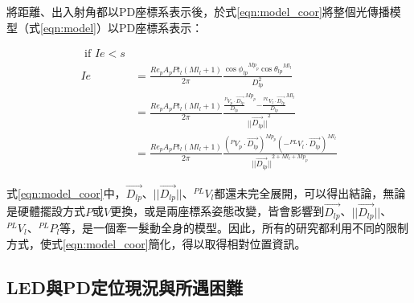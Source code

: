\begin{description}
        \qquad
        將距離、出入射角都以PD座標系表示後，於式\ref{eqn:model_coor}將整個光傳播模型（式\ref{eqn:model}）以PD座標系表示：

        \begin{equation}
            \label{eqn:model_coor}
            \begin{aligned}
                \text { if } Ie<s \\
                Ie &= \frac{Re_pA_pPt_l(Ml_{l}+1)}{2 \pi} \frac{ {\cos\phi_{lp}}^{Mp_{p}} {\cos \theta_{lp}}^{Ml_{l}}}{D^2_{lp}}\\
                    & = \frac{Re_pA_pPt_l(Ml_{l}+1)}{2 \pi} \frac{ {\frac{^{P}V_p \cdot \vec{D_{lp}}}{D_{lp}}}^{Mp_{p}} {-\frac{^{PL}V_l \cdot \vec{D_{lp}}}{D_{lp}}}^{Ml_{l}}}  {{||\vec{D_{lp}}||}^2}\\
                    & = \frac{Re_pA_pPt_l(Ml_{l}+1)}{2 \pi} \frac{ {{(^{P}V_p \cdot \vec{D_{lp}})}}^{Mp_{p}} {(-^{PL}V_l \cdot \vec{D_{lp}})}^{Ml_{l}}}  {{||\vec{D_{lp}}||}^{2+Ml_l+Mp_p}}
            \end{aligned}
        \end{equation}

        \qquad
        式\ref{eqn:model_coor}中，$\vec{D_{lp}}$、$||\vec{D_{lp}}||$、$^{PL}V_l$都還未完全展開，可以得出結論，無論是硬體擺設方式$P$或$V$更換，或是兩座標系姿態改變，皆會影響到$\vec{D_{lp}}$、$||\vec{D_{lp}}||$、$^{PL}V_l$、$^{PL}P_l$等，是一個牽一髮動全身的模型。因此，所有的研究都利用不同的限制方式，使式\ref{eqn:model_coor}簡化，得以取得相對位置資訊。

        \end{description}   


        


















    \subsection{LED與PD定位現況與所遇困難}
    \label{chp:LEDPD_problem}



    


   

    


